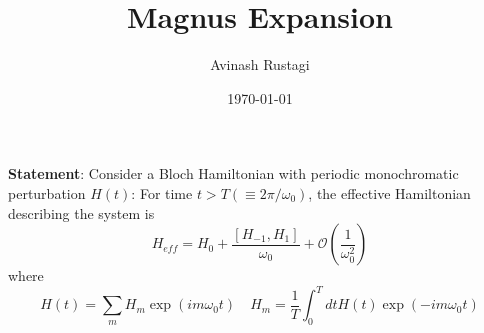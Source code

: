 \documentclass[aps,prb,onecolumn,notitlepage,showpacs,floatfix,superscriptaddress]{revtex4-1}
\begin{document}
\title{Magnus Expansion}

\author{Avinash Rustagi}
%
\date{\today}

\maketitle
%
\textbf{Statement}: Consider a Bloch Hamiltonian with periodic monochromatic perturbation $H(t)$: For time $t>T(\equiv 2\pi/\omega_0)$, the effective Hamiltonian describing the system is
\begin{equation}
H_{eff} = H_0 + \dfrac{\left[ H_{-1},H_{1}\right]}{\omega_0} + \mathcal{O}\left( \dfrac{1}{\omega_0^2}\right)
\end{equation}
where 
\begin{equation}
H(t)=\sum_{m} H_{m} \exp\left( im\omega_0 t\right) \quad H_m = \dfrac{1}{T}\int_0^T dt H(t) \exp\left( -im\omega_0 t\right)
\end{equation}
\end{document}
